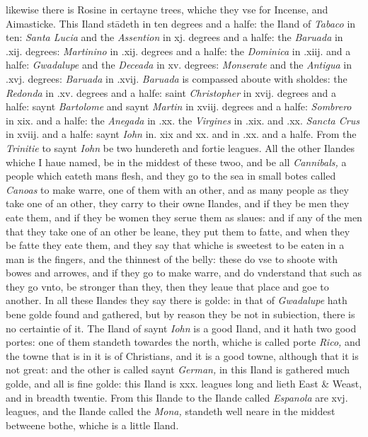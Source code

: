 \documentclass[11pt,twoside]{article}\makeatletter
\def\gap{}
\begin{document}
	\normalmarginpar
       likewise there is Rosine in certayne trees, whiche they vse for Incense, and Aimasticke. This Iland stādeth in ten degrees and a halfe: the Iland of {\itshape Tabaco} in ten: {\itshape Santa Lu­cia} and the {\itshape Assention} in xj. degrees and a halfe: the {\itshape Baruada} in .xij. degrees: {\itshape Martinino} in .xij. degrees and a halfe: the {\itshape Dominica} in .xiij. and a halfe: {\itshape Gwadalupe} and the {\itshape Deceada} in xv. degrees: {\itshape Monserate} and the {\itshape Antigua} in .xvj. degrees: {\itshape Baruada} in .xvij. {\itshape Baruada} is compassed aboute with sholdes: 
	\normalmarginpar
      \marginnote{[...] {\gap •}andes.} the {\itshape Redonda} in .xv. degrees and a halfe: saint {\itshape Christopher} in xvij. degrees and a halfe: saynt {\itshape Bartolome} and saynt {\itshape Martin} in xviij. degrees and a halfe: {\itshape Sombrero} in xix. and a halfe: the {\itshape Anegada} in .xx. the {\itshape Virgines} in .xix. and .xx. {\itshape Sancta Crus} in %
 xviij. and a halfe: saynt {\itshape Iohn} in. xix and xx. and in .xx. and a halfe. From the {\itshape Trinitie} to saynt {\itshape Iohn} be two hundereth and fortie leagues. All the other Ilandes whiche I haue named, be in the middest of these twoo, and be all {\itshape Cannibals,} a people which eateth mans flesh, and they go to the sea in small botes 
	\normalmarginpar
      \marginnote{Canibal[...] {\gap •}.} called {\itshape Canoas} to make warre, one of them with an other, and as many people as they take one of an other, they carry to their owne Ilandes, and if they be men they eate them, and if they be women they serue them as slaues: and if any of the men that they take one of an other be leane, they put them to fatte, and when they be fatte they eate them, and they say that whiche is sweetest to be eaten in a man is the fingers, and the thinnest of the belly: these do vse to shoote with bowes and ar­rowes, and if they go to make warre, and do vnderstand that such as they go vnto, be stronger than they, then they leaue that place and goe to another. In all these Ilandes they say there is golde: in that of {\itshape Gwadalupe} hath bene golde found and gathered, but by reason they be not in subiection, there is no certaintie of it. The Iland of saynt {\itshape Iohn} is a good Iland, and 
	\normalmarginpar
       it hath two good portes: one of them standeth towardes the north, whiche is called porte {\itshape Rico,} and the towne that is in it is of Christians, and it is a good towne, although that it is not great: and the other is called saynt {\itshape German,} in this I­land is gathered much golde, and all is fine golde: this Iland is xxx. leagues long and lieth East \& Weast, and in breadth twentie. From this Ilande to the Ilande called {\itshape Espanola} are xvj. leagues, and the Ilande called the {\itshape Mona,} standeth well neare in the middest betweene bothe, whiche is a little Iland. 
\end{document}
